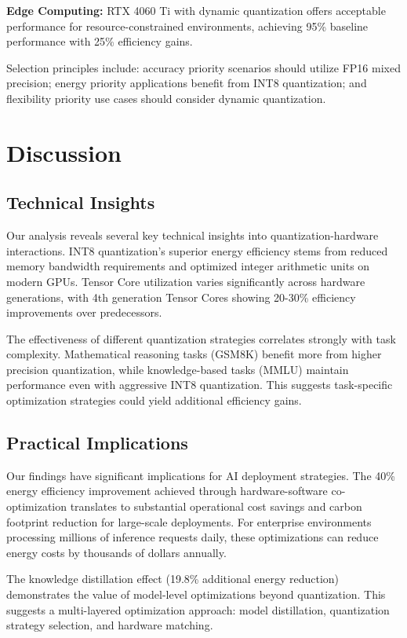 \documentclass[sigconf,review]{acmart}
\begin{document}
\textbf{Edge Computing:} RTX 4060 Ti with dynamic quantization offers acceptable performance for resource-constrained environments, achieving 95\% baseline performance with 25\% efficiency gains.

Selection principles include: accuracy priority scenarios should utilize FP16 mixed precision; energy priority applications benefit from INT8 quantization; and flexibility priority use cases should consider dynamic quantization.

\section{Discussion}

\subsection{Technical Insights}

Our analysis reveals several key technical insights into quantization-hardware interactions. INT8 quantization's superior energy efficiency stems from reduced memory bandwidth requirements and optimized integer arithmetic units on modern GPUs. Tensor Core utilization varies significantly across hardware generations, with 4th generation Tensor Cores showing 20-30\% efficiency improvements over predecessors.

The effectiveness of different quantization strategies correlates strongly with task complexity. Mathematical reasoning tasks (GSM8K) benefit more from higher precision quantization, while knowledge-based tasks (MMLU) maintain performance even with aggressive INT8 quantization. This suggests task-specific optimization strategies could yield additional efficiency gains.

\subsection{Practical Implications}

Our findings have significant implications for AI deployment strategies. The 40\% energy efficiency improvement achieved through hardware-software co-optimization translates to substantial operational cost savings and carbon footprint reduction for large-scale deployments. For enterprise environments processing millions of inference requests daily, these optimizations can reduce energy costs by thousands of dollars annually.

The knowledge distillation effect (19.8\% additional energy reduction) demonstrates the value of model-level optimizations beyond quantization. This suggests a multi-layered optimization approach: model distillation, quantization strategy selection, and hardware matching.
\end{document}

